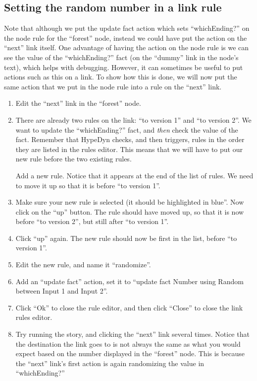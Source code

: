 \documentclass{article}
\begin{document}
\subsection{Setting the random number in a link rule}

Note that although we put the update fact action which sets 
``whichEnding?'' on the node rule for the ``forest'' node, instead we 
could have put the action on the ``next'' link itself. One advantage 
of having the action on the node rule is we can see the value of the 
``whichEnding?'' fact (on the ``dummy'' link in the node's text), 
which helps with debugging. However, it can sometimes be useful to 
put actions such as this on a link. To show how this is done, we will 
now put the same action that we put in the node rule into a rule on 
the ``next'' link.

\begin{enumerate}
    \item Edit the ``next'' link in the ``forest'' node.
    \item There are already two rules on the link: ``to version 1'' 
    and ``to version 2''. We want to update the ``whichEnding?'' 
    fact, and \textit{then} check the value of the fact. Remember 
    that HypeDyn checks, and then triggers, rules in the order they 
    are listed in the rules editor. This means that we will have to 
    put our new rule before the two existing rules.
    
    Add a new rule. Notice that it appears at the end of the list of 
    rules. We need to move it up so that it is before ``to version 
    1''.
    \item Make sure your new rule is selected (it should be 
    highlighted in blue''. Now click on the ``up'' button. The rule 
    should have moved up, so that it is now before ``to version 2'', 
    but still after ``to version 1''.
    \item Click ``up'' again. The new rule should now be first in the 
    list, before ``to version 1''.
    \item Edit the new rule, and name it ``randomize''.
    \item Add an ``update fact'' action, set it to ``update fact 
    Number using Random between Input 1 and Input 2''.
    \item Click ``Ok'' to close the rule editor, and then click 
    ``Close'' to close the link rules editor.
    \item Try running the story, and clicking the ``next'' link 
    several times. Notice that the destination the link goes to is 
    not always the same as what you would expect based on the number 
    displayed in the ``forest'' node. This is because the ``next'' 
    link's first action is again randomizing the value in 
    ``whichEnding?''
\end{enumerate}
\end{document}
